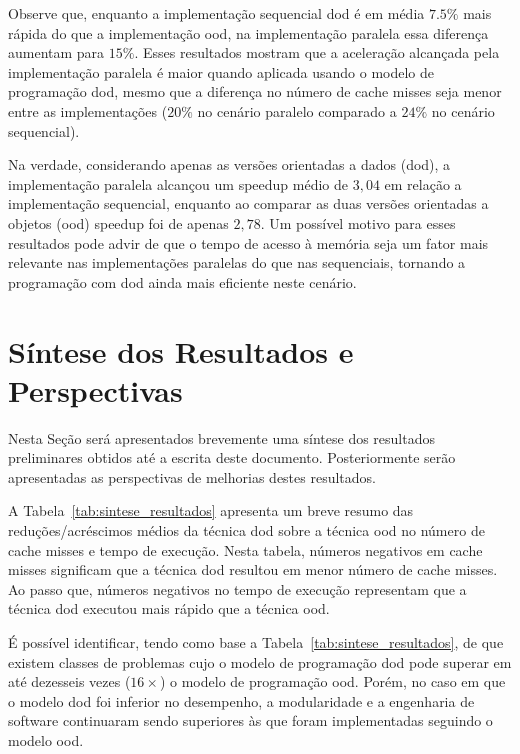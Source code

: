 Observe que, enquanto a implementação sequencial \ac{dod} é em média $ 7.5 \% $ mais rápida do que a implementação \ac{ood}, na implementação paralela essa diferença aumentam para $ 15 \% $.
Esses resultados mostram que a aceleração alcançada pela implementação paralela é maior quando aplicada usando o modelo de programação \ac{dod}, mesmo que a diferença no número de cache misses seja menor entre as implementações ($ 20 \% $ no cenário paralelo comparado a $ 24 \% $ no cenário sequencial).

Na verdade, considerando apenas as versões orientadas a dados (\ac{dod}), a implementação paralela alcançou um speedup médio de $ 3,04 $ em relação a implementação sequencial, enquanto ao comparar as duas versões  orientadas a objetos (\ac{ood}) speedup foi de apenas $ 2,78 $.
Um possível motivo para esses resultados pode advir de que o tempo de acesso à memória seja um fator mais relevante nas implementações paralelas do que nas sequenciais, tornando a programação com \ac{dod} ainda mais eficiente neste cenário.


\section{Síntese dos Resultados e Perspectivas}
\label{sec:sintese_resultado}

Nesta Seção será apresentados brevemente uma síntese dos resultados preliminares obtidos até a escrita deste documento. Posteriormente serão apresentadas as perspectivas de melhorias destes resultados.

A Tabela~\ref{tab:sintese_resultados} apresenta um breve resumo das reduções/acréscimos médios da técnica \ac{dod} sobre a técnica \ac{ood} no número de cache misses e tempo de execução.
Nesta tabela, números negativos em cache misses significam que a técnica \ac{dod} resultou em menor número de cache misses.
Ao passo que, números negativos no tempo de execução representam que a técnica \ac{dod} executou mais rápido que a técnica \ac{ood}.

É possível identificar, tendo como base a Tabela~\ref{tab:sintese_resultados}, de que existem classes de problemas cujo o modelo de programação \ac{dod} pode superar em até dezesseis vezes ($16 \times$) o modelo de programação \ac{ood}.
Porém, no caso em que o modelo \ac{dod} foi inferior no desempenho, a modularidade e a engenharia de software continuaram sendo superiores às que foram implementadas seguindo o modelo \ac{ood}.


